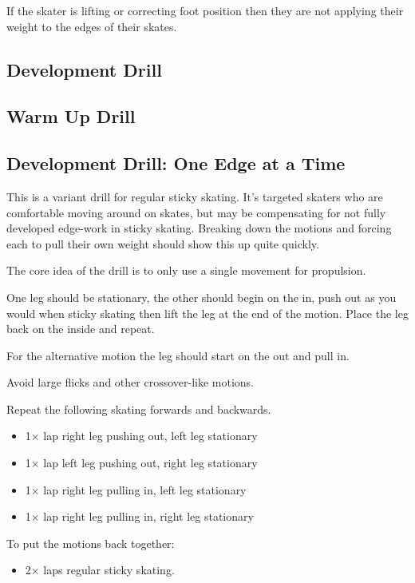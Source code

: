 If the skater is lifting or correcting foot position then they are not applying their weight to the edges of their skates.  

\subsection*{Development Drill}

\subsection*{Warm Up Drill}

\subsection*{Development Drill: One Edge at a Time}
\label{drill:sticky/eggshells/one_edge}

This is a variant drill for regular sticky skating. 
It's targeted skaters who are comfortable moving around on skates, but may be compensating for not fully developed edge-work in sticky skating.
Breaking down the motions and forcing each to pull their own weight should show this up quite quickly.

The core idea of the drill is to only use a single movement for propulsion.  

One leg should be stationary, the other should begin on the in, push out as you would when sticky skating then lift the leg at the end of the motion.  
Place the leg back on the inside and repeat. 

For the alternative motion the leg should start on the out and pull in.   

Avoid large flicks and other crossover-like motions.    

Repeat the following skating forwards and backwards. 
\begin{itemize}
    \item 1$\times$ lap right leg pushing out, left leg stationary  
    \item 1$\times$ lap left leg pushing out, right leg stationary 
    \item 1$\times$ lap right leg pulling in, left leg stationary 
    \item 1$\times$ lap right leg pulling in, right leg stationary 
\end{itemize}

To put the motions back together:
\begin{itemize}
    \item 2$\times$ laps regular sticky skating. 
\end{itemize}


